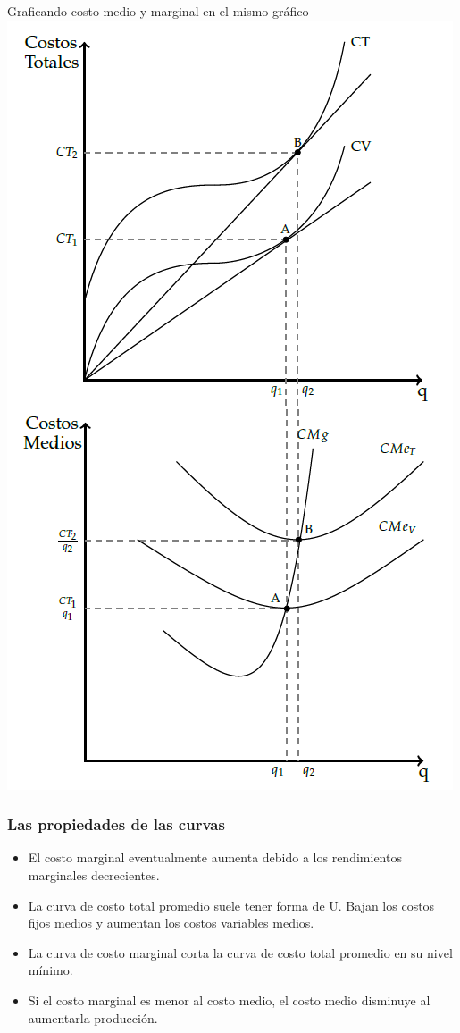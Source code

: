 \documentclass{beamer}
\begin{document}
\begin{frame}{Graficando costo medio y marginal en el mismo gráfico}
    \centering
    \includegraphics[scale=0.9]{../Figures/Costoscp.png}
    \end{frame}
    
    \begin{frame}
    \frametitle{Las propiedades de las curvas}
    \begin{itemize}
        \item El costo marginal eventualmente aumenta debido a los rendimientos marginales decrecientes.
        \item La curva de costo total promedio suele tener forma de U. Bajan los costos fijos medios y aumentan los costos variables medios.
        \item La curva de costo marginal corta la curva de costo total promedio en su nivel mínimo.
        \item Si el costo marginal es menor al costo medio, el costo medio disminuye al aumentarla producción.
    \end{itemize}
\end{frame}
\end{document}
